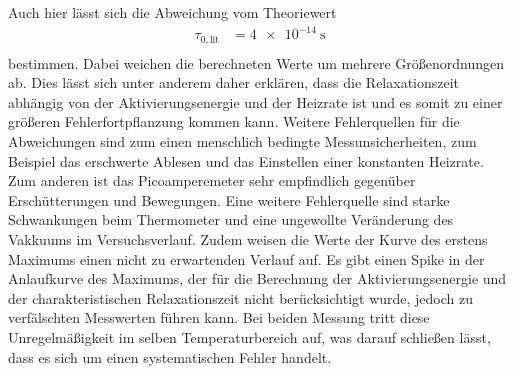  
Auch hier lässt sich die Abweichung vom Theoriewert\cite{RMucillo} 
\begin{align*}
    \tau_{0,\text{lit}}&= \qty{4e-14}{\second}\\
\end{align*}
bestimmen. Dabei weichen die berechneten Werte um mehrere
Größenordnungen ab. Dies lässt sich unter anderem daher erklären, dass die Relaxationszeit abhängig von
der Aktivierungsenergie und der Heizrate ist und es somit zu einer größeren Fehlerfortpflanzung kommen kann.
Weitere Fehlerquellen für die Abweichungen sind zum einen menschlich bedingte Messunsicherheiten, zum Beispiel
das erschwerte Ablesen und das Einstellen einer konstanten Heizrate. Zum anderen ist das Picoamperemeter
sehr empfindlich gegenüber Erschütterungen und Bewegungen.
Eine weitere Fehlerquelle sind starke Schwankungen beim Thermometer und eine ungewollte Veränderung 
des Vakkuums im Versuchsverlauf. Zudem weisen die Werte der Kurve des erstens Maximums einen nicht zu erwartenden Verlauf auf.
Es gibt einen Spike in der Anlaufkurve des Maximums, der für die Berechnung der Aktivierungsenergie und der
charakteristischen Relaxationszeit nicht berücksichtigt wurde, jedoch zu verfälschten Messwerten führen kann.
Bei beiden Messung tritt diese Unregelmäßigkeit im selben Temperaturbereich auf, was darauf schließen lässt,
dass es sich um einen systematischen Fehler handelt.